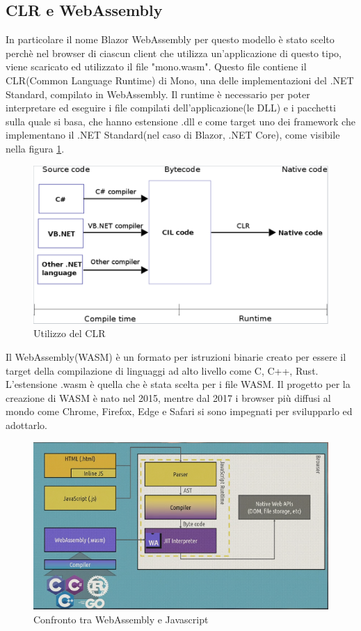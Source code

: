 \subsection{CLR e WebAssembly}\label{sez:webAssembly}
In particolare il nome Blazor WebAssembly per questo modello \`e stato scelto perch\`e nel browser di ciascun client che utilizza un'applicazione di questo tipo, viene scaricato ed utilizzato il file "mono.wasm".
Questo file contiene il CLR(Common Language Runtime) di Mono, una delle implementazioni del .NET Standard, compilato in WebAssembly.
Il runtime \`e necessario per poter interpretare ed eseguire i file compilati dell'applicazione(le DLL) e i pacchetti sulla quale si basa, che hanno estensione .dll e come target uno dei framework che implementano il .NET Standard(nel caso di Blazor, .NET Core), come visibile nella figura \ref{fig:CLR}.

\begin{figure}[H]
	\centerline{\includegraphics[scale=0.5]{figure/CLR.PNG}}
	\caption{Utilizzo del CLR}
	\label{fig:CLR}
\end{figure}

Il WebAssembly(WASM) \`e un formato per istruzioni binarie creato per essere il target della compilazione di linguaggi ad alto livello come C, C++, Rust\cite{webAssemblyOfficialWebsite}.
L'estensione .wasm \`e quella che \`e stata scelta per i file WASM.
Il progetto per la creazione di WASM \`e nato nel 2015, mentre dal 2017 i browser pi\`u diffusi al mondo come Chrome, Firefox, Edge e Safari si sono impegnati per svilupparlo ed adottarlo\cite{webAssemblySupport}.

\begin{figure}[H]
	\centerline{\includegraphics[scale=0.7]{figure/WasmVSJavascript.PNG}}
	\caption{Confronto tra WebAssembly e Javascript}
	\label{fig:WasmVSJavascript}
\end{figure}

